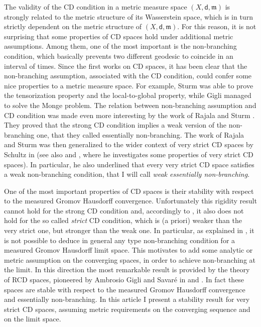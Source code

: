 \documentclass[11pt,twoside,a4paper]{article}
\newcommand{\di}{\mathsf d} %
\newcommand{\m}{\mathfrak m} %
\theoremstyle{theorem}
\theoremstyle{definition}
\theoremstyle{remark}
\theoremstyle{proof}
\begin{document}
The validity of the CD condition in a metric measure space $(X,\di,\m)$ is strongly related to the metric structure of its Wasserstein space, which is in turn strictly dependent on the metric structure of $(X,\di,\m)$. For this reason, it is not surprising that some properties of CD spaces hold under additional metric assumptions. Among them, one of the most important is the non-branching condition, which basically prevents two different geodesic to coincide in an interval of times. Since the first works on CD spaces, it has been clear that the non-branching assumption, associated with the CD condition, could confer some nice properties to a metric measure space. For example, Sturm \cite{sturm2006} was able to prove the tensorization property and the local-to-global property, while Gigli \cite{gigli11} managed to solve the Monge problem. The relation between non-branching assumption and CD condition was made even more interesting by the work of Rajala and Sturm \cite{rajalasturm}. They proved that the strong CD condition implies a weak version of the non-branching one, that they called essentially non-branching. 
The work of Rajala and Sturm was then generalized to the wider context of very strict CD spaces by Schultz in \cite{schultz2017existence} (see also \cite{Schultz2019EquivalentDO} and \cite{Schultz2019OnOO}, where he investigates some properties of very strict CD spaces). In particular, he also underlined that every very strict CD space satisfies a weak non-branching condition, that I will call \textit{weak essentially non-branching}.

One of the most important properties of CD spaces is their stability with respect to the measured Gromov Hausdorff convergence. Unfortunately this rigidity result cannot hold for the strong CD condition and, accordingly to \cite{MM-Example}, it also does not hold for the so called \textit{strict} CD condition, which is (a priori) weaker than the very strict one, but stronger than the weak one.
In particular, as explained in \cite{MM-Example}, it is not possible to deduce in general any type non-branching condition for a measured Gromov Hausdorff limit space. This motivates to add some analytic or metric assumption on the converging spaces, in order to achieve non-branching at the limit. In this direction the most remarkable result is provided by the theory of RCD spaces, pioneered by Ambrosio Gigli and Savaré in \cite{Ambrosio_2013} and \cite{Ambrosio_2014}. In fact these spaces are stable with respect to the measured Gromov Hausdorff convergence and essentially non-branching. In this article I present a stability result for very strict CD spaces, assuming metric requirements on the converging sequence and on the limit space. 
\end{document}
